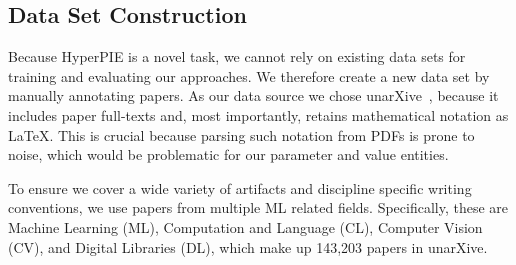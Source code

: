 \subsection{Data Set Construction}\label{sec:data-set-contruction}





Because HyperPIE is a novel task, we cannot rely on existing data sets for training and evaluating our approaches. We therefore create a new data set by manually annotating papers. As our data source we chose unarXive~\cite{Saier2023unarXive}, because it includes paper full-texts and, most importantly, retains mathematical notation as \LaTeX. This is crucial because parsing such notation from PDFs is prone to noise, which would be problematic for our parameter and value entities.  %

To ensure we cover a wide variety of artifacts and discipline specific writing conventions, we use papers from multiple ML related fields. Specifically, these are Machine Learning (ML), Computation and Language (CL), Computer Vision (CV), and Digital Libraries (DL), which make up 143,203 papers in unarXive.%

